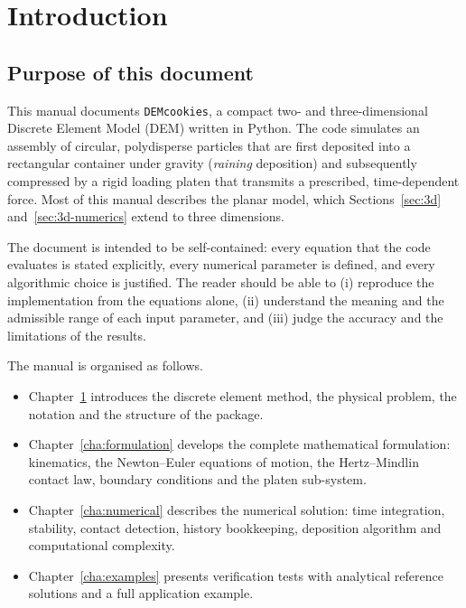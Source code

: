 \chapter{Introduction}
\label{cha:introduction}

\section{Purpose of this document}
\label{sec:purpose}

This manual documents \texttt{DEMcookies}, a compact two- and three-dimensional Discrete
Element Model (DEM) written in Python.  The code simulates an assembly of
circular, polydisperse particles that are first deposited into a rectangular
container under gravity (\emph{raining} deposition) and subsequently compressed
by a rigid loading platen that transmits a prescribed, time-dependent force.
Most of this manual describes the planar model, which Sections~\ref{sec:3d} and~\ref{sec:3d-numerics} extend to three dimensions.

The document is intended to be self-contained: every equation that the code
evaluates is stated explicitly, every numerical parameter is defined, and every
algorithmic choice is justified.  The reader should be able to (i) reproduce the
implementation from the equations alone, (ii) understand the meaning and the
admissible range of each input parameter, and (iii) judge the accuracy and the
limitations of the results.

The manual is organised as follows.
\begin{itemize}[leftmargin=1.6em]
  \item Chapter~\ref{cha:introduction} introduces the discrete element method,
        the physical problem, the notation and the structure of the package.
  \item Chapter~\ref{cha:formulation} develops the complete mathematical
        formulation: kinematics, the Newton--Euler equations of motion, the
        Hertz--Mindlin contact law, boundary conditions and the platen
        sub-system.
  \item Chapter~\ref{cha:numerical} describes the numerical solution: time
        integration, stability, contact detection, history bookkeeping,
        deposition algorithm and computational complexity.
  \item Chapter~\ref{cha:examples} presents verification tests with analytical
        reference solutions and a full application example.
\end{itemize}

